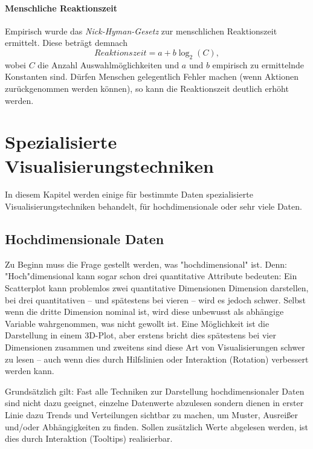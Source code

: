 			\subsubsection{Menschliche Reaktionszeit}
				Empirisch wurde das \emph{Nick-Hyman-Gesetz} zur menschlichen Reaktionszeit ermittelt. Diese beträgt demnach
				\begin{equation}
					\mathit{Reaktionszeit} = a + b \log_2(C),
				\end{equation}
				wobei \(C\) die Anzahl Auswahlmöglichkeiten und \(a\) und \(b\) empirisch zu ermittelnde Konstanten sind. Dürfen Menschen gelegentlich Fehler machen (\zB wenn Aktionen zurückgenommen werden können), so kann die Reaktionszeit deutlich erhöht werden.

\chapter{Spezialisierte Visualisierungstechniken}
	In diesem Kapitel werden einige für bestimmte Daten spezialisierte Visualisierungstechniken behandelt, \bspw für hochdimensionale oder sehr viele Daten.

	\section{Hochdimensionale Daten}
		\label{sec:highdim}

		Zu Beginn muss die Frage gestellt werden, was "hochdimensional" ist. Denn: "Hoch"dimensional kann sogar schon drei quantitative Attribute bedeuten: Ein Scatterplot kann \bspw problemlos zwei quantitative Dimensionen Dimension darstellen, bei drei quantitativen -- und spätestens bei vieren -- wird es jedoch schwer. Selbst wenn die dritte Dimension nominal ist, wird diese unbewusst als abhängige Variable wahrgenommen, was \ggf nicht gewollt ist. Eine Möglichkeit ist die Darstellung in einem 3D-Plot, aber erstens bricht dies spätestens bei vier Dimensionen zusammen und zweitens sind diese Art von Visualisierungen schwer zu lesen -- auch wenn dies durch Hilfslinien oder Interaktion (\bspw Rotation) verbessert werden kann.

		Grundsätzlich gilt: Fast alle Techniken zur Darstellung hochdimensionaler Daten sind nicht dazu geeignet, einzelne Datenwerte abzulesen sondern dienen in erster Linie dazu Trends und Verteilungen sichtbar zu machen, um Muster, Ausreißer und/oder Abhängigkeiten zu finden. Sollen zusätzlich Werte abgelesen werden, ist dies durch Interaktion (\zB Tooltips) realisierbar.

